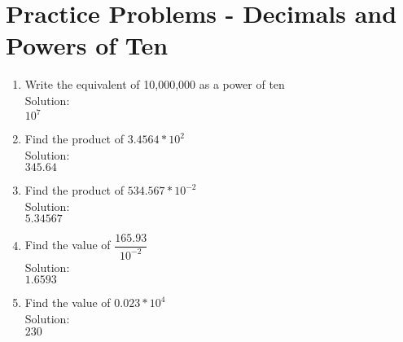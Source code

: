 \section*{Practice Problems - Decimals and Powers of Ten} 
\begin{enumerate}
\item Write the equivalent of 10,000,000 as a power of ten\\
Solution:\\
$\boxed{10^7}$
\item Find the product of $3.4564*10^2$\\
Solution:\\
$\boxed{345.64}$
\vspace{0.2cm}
\item Find the product of $534.567*10^{-2}$\\
Solution:\\
$\boxed{5.34567}$
\vspace{0.2cm}
\item Find the value of $\dfrac{165.93}{10^{-2}}$\\
Solution:\\
$\boxed{1.6593}$
\vspace{0.2cm}
\item Find the value of $0.023*10^4$\\
Solution:\\
$\boxed{230}$
\end{enumerate}

